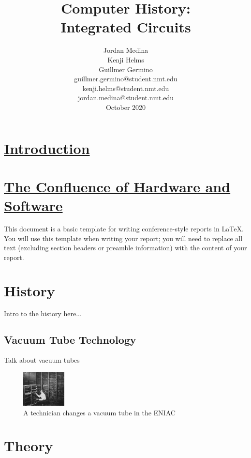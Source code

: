 \documentclass[letterpaper, 10 pt, conference]{IEEEconf}
\title{\LARGE \bf
Computer History:\\Integrated Circuits
}
\author{Jordan Medina\\Kenji Helms\\Guillmer Germino\\
\small guillmer.germino@student.nmt.edu\\
\small kenji.helms@student.nmt.edu\\
\small jordan.medina@student.nmt.edu\\
\small {October 2020}
}
\begin{document}
\maketitle




\section{\underline{Introduction}\\\\
\small {\underline{The Confluence of Hardware and Software}}}

This document is a basic template for writing conference-style                  
reports in LaTeX. You will use this template when writing                       
your report; you will need to replace all text (excluding                       
section headers or preamble information) with the content                       
of your report.

\section{History}
Intro to the history here...

\subsection{Vacuum Tube Technology}
Talk about vacuum tubes

\begin{figure}[h!]
\centering
\includegraphics[width=0.2\textwidth]{ENIAC-changing_a_tube.jpg}
\caption{A technician changes a vacuum tube in the ENIAC}
\label{fig:example}
\end{figure} 




\section{Theory}

\end{document}
